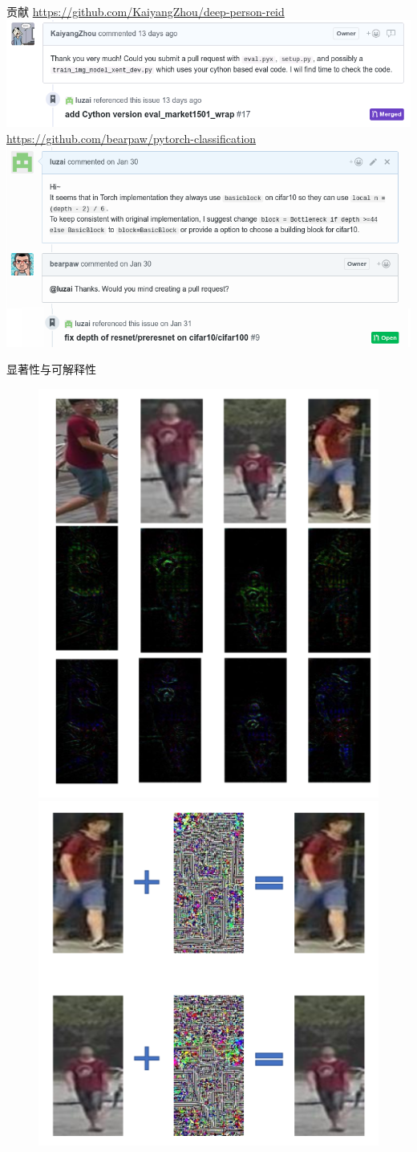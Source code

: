 \documentclass[usenames,dvipsnames,notes]{beamer}
\begin{document}
\begin{frame}{贡献}
\url{https://github.com/KaiyangZhou/deep-person-reid}
		\includegraphics[width=\textwidth]{fig/2018-06-01-12-19-14.png}
	\url{	https://github.com/bearpaw/pytorch-classification}
		\includegraphics[width=\textwidth]{fig/2018-06-01-12-19-39.png}
\end{frame}


\begin{frame}{显著性与可解释性}
	\begin{figure}
		\centering
		\includegraphics[width=.47\textwidth]{2018-05-21-09-58-23.png}
		\includegraphics[width=.47\textwidth]{2018-05-21-10-31-13.png}
	\end{figure}

\end{frame}
\end{document}
